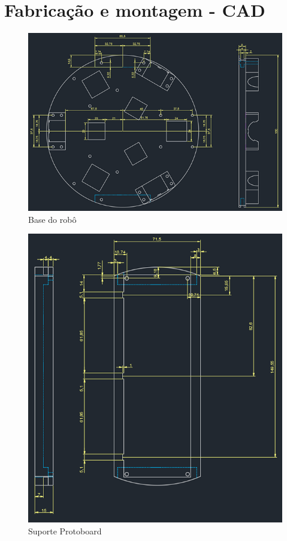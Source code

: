 \chapter{Fabricação e montagem - CAD}
\label{att_fabricao_montagem_cad}

\begin{figure}[h]
	\centering
	\includegraphics{figures/cad1}
	\caption{Base do robô}
	\label{fig:base_robo}
\end{figure}

\begin{figure}[h]
	\centering
	\includegraphics{figures/cad2}
	\caption{Suporte Protoboard}
	\label{fig:suport_protoboard}
\end{figure}

